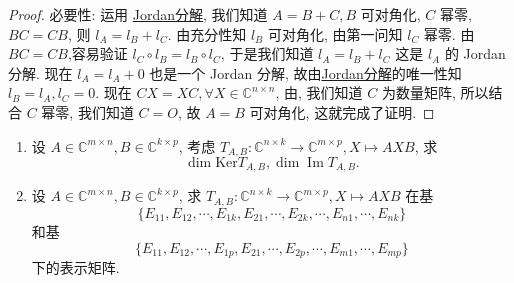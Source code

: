\documentclass[../../main.tex]{subfiles}%
\begin{document}
\begin{proof}
{\heiti 必要性: }运用 \hyperref[theorem:Jordan-Chevalley分解]{Jordan分解}, 我们知道 $A = B + C, B$ 可对角化, $C$ 幂零, $BC = CB$, 则 $l_A = l_B + l_C$. 由充分性知 $l_B$ 可对角化, 由第一问知 $l_C$ 幂零. 由$BC=CB$,容易验证 $l_C \circ  l_B = l_B \circ  l_C$, 于是我们知道 $l_A = l_B + l_C$ 这是 $l_A$ 的 Jordan 分解. 现在 $l_A = l_A + 0$ 也是一个 Jordan 分解, 故由\hyperref[theorem:Jordan-Chevalley分解]{Jordan分解}的唯一性知$l_B = l_A, l_C = 0$. 现在 $CX = XC, \forall X \in \mathbb{C}^{n \times n}$, 由, 我们知道 $C$ 为数量矩阵, 所以结合 $C$ 幂零, 我们知道 $C = O$, 故 $A = B$ 可对角化, 这就完成了证明.


\end{proof}

\begin{example}
\begin{enumerate}
\item 设 $A \in \mathbb{C}^{m \times n}, B \in \mathbb{C}^{k \times p}$, 考虑 $T_{A,B} : \mathbb{C}^{n \times k} \to \mathbb{C}^{m \times p}, X \mapsto AXB$, 求
$$\dim \mathrm{Ker} T_{A,B}, \dim \operatorname{Im} T_{A,B}.$$

\item 设 $A \in \mathbb{C}^{m \times n}, B \in \mathbb{C}^{k \times p}$, 求 $T_{A,B} : \mathbb{C}^{n \times k} \to \mathbb{C}^{m \times p}, X \mapsto AXB$ 在基
$$\{E_{11}, E_{12}, \cdots, E_{1k}, E_{21}, \cdots, E_{2k}, \cdots, E_{n1}, \cdots, E_{nk}\}$$
和基
$$\{E_{11}, E_{12}, \cdots, E_{1p}, E_{21}, \cdots, E_{2p}, \cdots, E_{m1}, \cdots, E_{mp}\}$$
下的表示矩阵.
\end{enumerate}
\end{example}
\end{document}
